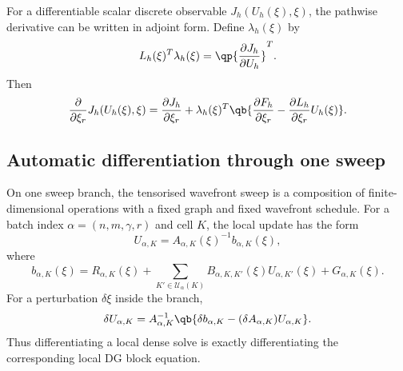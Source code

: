 \documentclass[final]{amsart}
\begin{document}
For a differentiable scalar discrete observable
$J_h(U_h(\xi),\xi)$, the pathwise derivative can be written in adjoint
form. Define $\lambda_h(\xi)$ by
\begin{equation}
  L_h(\xi)^T\lambda_h(\xi)
  =
  \qp{
    \frac{\partial J_h}{\partial U_h}
  }^T.
  \label{eq:uq_discrete_adjoint}
\end{equation}
Then
\begin{equation}
  \frac{\partial}{\partial \xi_r}
  J_h(U_h(\xi),\xi)
  =
  \frac{\partial J_h}{\partial \xi_r}
  +
  \lambda_h(\xi)^T
  \qb{
    \frac{\partial F_h}{\partial \xi_r}
    -
    \frac{\partial L_h}{\partial \xi_r}U_h(\xi)
  }.
  \label{eq:uq_reverse_sensitivity}
\end{equation}

\subsection{Automatic differentiation through one sweep}

On one sweep branch, the tensorised wavefront sweep is a composition of
finite-dimensional operations with a fixed graph and fixed wavefront
schedule. For a batch index $\alpha=(n,m,\gamma,r)$ and cell $K$, the
local update has the form
\begin{equation}
  U_{\alpha,K}
  =
  A_{\alpha,K}(\xi)^{-1}
  b_{\alpha,K}(\xi),
  \label{eq:uq_local_solve}
\end{equation}
where
\begin{equation}
  b_{\alpha,K}(\xi)
  =
  R_{\alpha,K}(\xi)
  +
  \sum_{K'\in\mathcal{U}_{\alpha}(K)}
  B_{\alpha,K,K'}(\xi)U_{\alpha,K'}(\xi)
  +
  G_{\alpha,K}(\xi).
  \label{eq:uq_local_rhs}
\end{equation}
For a perturbation $\delta\xi$ inside the branch,
\begin{equation}
  \delta U_{\alpha,K}
  =
  A_{\alpha,K}^{-1}
  \qb{
    \delta b_{\alpha,K}
    -
    (\delta A_{\alpha,K})U_{\alpha,K}
  }.
  \label{eq:uq_local_solve_derivative}
\end{equation}
Thus differentiating a local dense solve is exactly differentiating the
corresponding local DG block equation.
\end{document}
